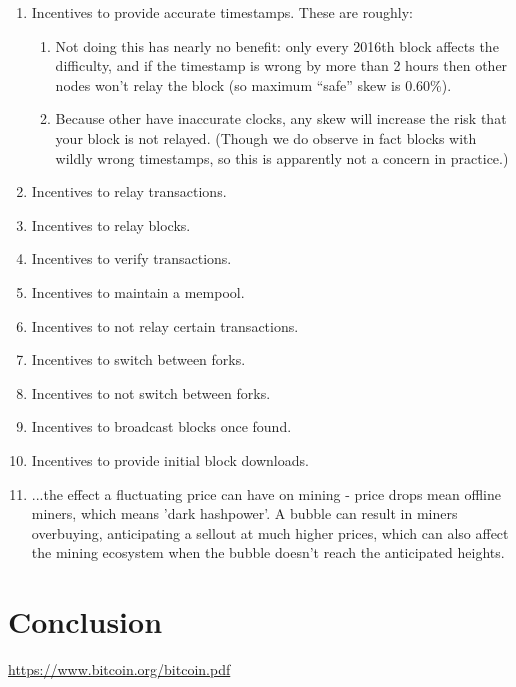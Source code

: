 \documentclass[letterpaper]{article}
\begin{document}
\begin{enumerate}
\item Incentives to provide accurate timestamps. These are roughly:
\begin{enumerate}
\item Not doing this has nearly no benefit: only every 2016th block affects the
difficulty, and if the timestamp is wrong by more than 2 hours then other nodes
won't relay the block (so maximum ``safe'' skew is 0.60\%).
\item Because other have inaccurate clocks, any skew will increase the risk that
your block is not relayed. (Though we do observe in fact blocks with wildly wrong
timestamps, so this is apparently not a concern in practice.)
\end{enumerate}

\item Incentives to relay transactions.

\item Incentives to relay blocks.

\item Incentives to verify transactions.

\item Incentives to maintain a mempool.

\item Incentives to not relay certain transactions.

\item Incentives to switch between forks.

\item Incentives to not switch between forks.

\item Incentives to broadcast blocks once found.

\item Incentives to provide initial block downloads.

\item ...the effect a fluctuating price can have on mining - price drops mean offline miners, which means 'dark hashpower'. A bubble can result in miners overbuying, anticipating a sellout at much higher prices, which can also affect the mining ecosystem when the bubble doesn't reach the anticipated heights.

\end{enumerate}

\section{Conclusion}

\begin{thebibliography}{9}
 \url{https://www.bitcoin.org/bitcoin.pdf}
\end{thebibliography}
\end{document}
